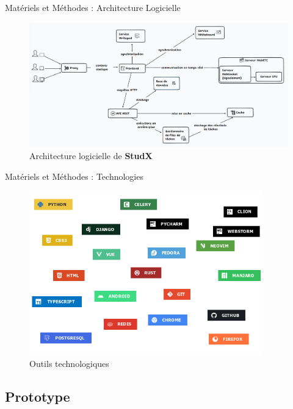 \documentclass{beamer}
\begin{document}
\begin{frame}{Matériels et Méthodes : \small{Architecture Logicielle}}
  \begin{figure}[H]
    \centering
    \includegraphics[width=1.05\textwidth]{../../images/studx-system-design.png}
    \caption{Architecture logicielle de \textbf{StudX}}
\end{figure}
\end{frame}

\begin{frame}{Matériels et Méthodes : \small{Technologies}}
  \begin{figure}[H]
    \centering
    \includegraphics[width=0.9\textwidth]{tech-stack}
    \caption{Outils technologiques}
\end{figure}
\end{frame}

\begin{frame}
  \begin{center}
    \section{\huge{Prototype}}
  \end{center}
\end{frame}
\end{document}
